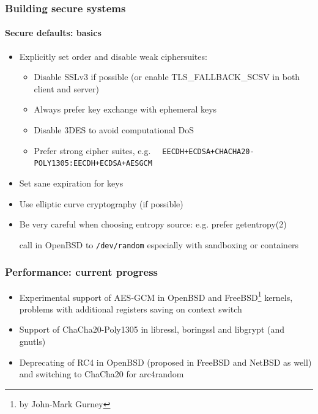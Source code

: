 \documentclass[11pt,t]{beamer}
\newcommand{\funcname}[1]{
	{\color{yellow!30} #1}
}
\newcommand{\cipher}[1]{
	{\color{blue!30} #1}
}
\begin{document}
\begin{frame}[fragile]
\frametitle{Building secure systems}
\framesubtitle{Secure defaults: basics}
\begin{itemize}
\item Explicitly set order and disable weak ciphersuites:
	\begin{itemize}
	\item Disable SSLv3 if possible (or enable \funcname{TLS\_FALLBACK\_SCSV} in both 
	client and server)
	\item Always prefer key exchange with ephemeral keys
	\item Disable 3DES to avoid computational DoS
	\item Prefer strong cipher suites, e.g. 
	{\scriptsize 
	\texttt{\cipher{EECDH+ECDSA+CHACHA20-POLY1305:EECDH+ECDSA+AESGCM}}
	}
	\end{itemize}
\item Set sane expiration for keys
\item Use elliptic curve cryptography (if possible)
\item Be very careful when choosing entropy source: e.g. prefer \funcname{getentropy(2)} 
call in OpenBSD to \texttt{/dev/random} especially with sandboxing or containers
\end{itemize}
\end{frame}

\begin{frame}
\frametitle{Performance: current progress}
\begin{itemize}
\item<1-> Experimental support of \cipher{AES-GCM} in OpenBSD and FreeBSD\footnote{by John-Mark 
Gurney} kernels, problems with additional registers saving on context switch
\item<2-> Support of \cipher{ChaCha20-Poly1305} in libressl, boringssl and libgrypt (and 
gnutls)
\item<3-> Deprecating of \cipher{RC4} in OpenBSD (proposed in FreeBSD and NetBSD as well) and switching to ChaCha20 for \funcname{arc4random}
\end{itemize}
\end{frame}
\end{document}
